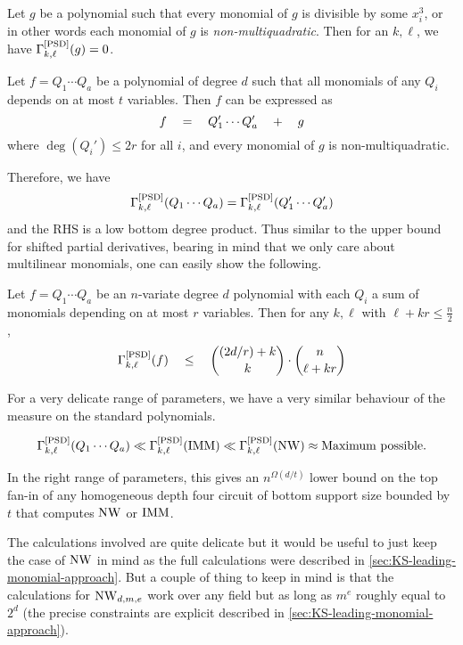 \begin{observation*}
Let $g$ be a polynomial such that every monomial of $g$ is divisible by some $x_i^3$, or in other words each monomial of $g$ is \emph{non-multiquadratic}. Then for an $k,\ell$, we have $\Gamma^{\mathrm{[PSD]}}_{k,\ell}(g) = 0$. 
\end{observation*}

\begin{observation*}
Let $f = Q_1 \cdots Q_a$ be a polynomial of degree $d$ such that all monomials of any $Q_i$ depends on at most $t$ variables. Then $f$ can be expressed as
\[
f \quad = \quad Q_1'\cdots Q_a' \quad + \quad g
\]
where $\deg(Q_i') \leq 2r$ for all $i$, and every monomial of $g$ is non-multiquadratic.
\end{observation*}

Therefore, we have
\[
\Gamma^{\mathrm{[PSD]}}_{k,\ell}(Q_1\cdots Q_a) = \Gamma^{\mathrm{[PSD]}}_{k,\ell}(Q_1'\cdots Q_a')
\]
and the RHS is a low bottom degree product. Thus similar to the upper bound for shifted partial derivatives, bearing in mind that we only care about multilinear monomials, one can easily show the following.

\begin{lemma*}
Let $f = Q_1\cdots Q_a$ be an $n$-variate degree $d$ polynomial with each $Q_i$ a sum of monomials depending on at most $r$ variables. Then for any $k,\ell$ with $\ell + kr\leq \frac{n}{2}$, 
\[
\Gamma^{\mathrm{[PSD]}}_{k,\ell}(f) \quad \leq \quad \binom{(2d/r) + k}{k} \cdot \binom{n}{\ell + kr}
\]
\end{lemma*}

For a very delicate range of parameters, we have a very similar behaviour of the measure on the standard polynomials. 

\[
\Gamma^{\mathrm{[PSD]}}_{k,\ell}(Q_1\cdots Q_a) \ll \Gamma^{\mathrm{[PSD]}}_{k,\ell}(\operatorname{\mathrm{IMM}}) \ll \Gamma^{\mathrm{[PSD]}}_{k,\ell}(\operatorname{\mathrm{NW}}) \approx \text{Maximum possible}.
\]

In the right range of parameters, this gives an $n^{\Omega(d/t)}$ lower bound on the top fan-in of any homogeneous depth four circuit of bottom support size bounded by $t$ that computes $\operatorname{\mathrm{NW}}$ or $\operatorname{\mathrm{IMM}}$. 

The calculations involved are quite delicate but it would be useful to just keep the case of $\operatorname{\mathrm{NW}}$ in mind as the full calculations were described in \autoref{sec:KS-leading-monomial-approach}. But a couple of thing to keep in mind is that the calculations for $\operatorname{\mathrm{NW}}_{d,m,e}$ work over any field but as long as $m^e$ roughly equal to $2^d$ (the precise constraints are explicit described in \autoref{sec:KS-leading-monomial-approach}). \\

